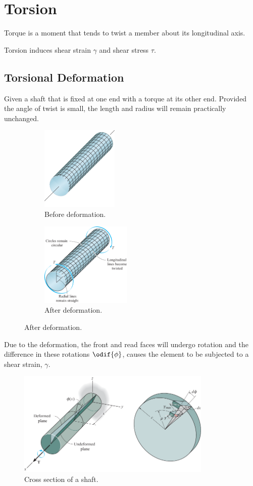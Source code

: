 \documentclass{article}
\begin{document}
\section{Torsion}
\begin{definition}[Torque]
    Torque is a moment that tends to twist a member about its longitudinal axis.
\end{definition}
Torsion induces shear strain \(\gamma\) and shear stress \(\tau\).
\subsection{Torsional Deformation}
Given a shaft that is fixed at one end with a torque at its other end.
Provided the angle of twist is small, the length and radius will remain practically
unchanged.
\begin{figure}[H]
    \centering
    \begin{subfigure}{0.47\linewidth}
        \centering
        \includegraphics[height = 4cm, keepaspectratio = true]{figures/shaft_before_torsion.pdf}
        \caption{Before deformation.} %
    \end{subfigure}
    \begin{subfigure}{0.47\linewidth}
        \centering
        \includegraphics[height = 4cm, keepaspectratio = true]{figures/shaft_after_torsion.pdf}
        \caption{After deformation.} %
    \end{subfigure}
\end{figure}
Due to the deformation, the front and read faces will undergo rotation and the difference in these rotations
\(\odif{\phi}\), causes the element to be subjected to a shear strain, \(\gamma\).
\begin{figure}[H]
    \centering
    \includegraphics[height = 5cm, keepaspectratio = true]{figures/shaft_cross_section.pdf}
    \caption{Cross section of a shaft.} %
\end{figure}
\end{document}
